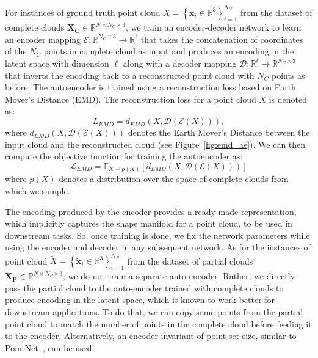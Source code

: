         For instances of ground truth point cloud $X=\left\{\mathbf{x}_{i} \in \mathbb{R}^{3}\right\}_{i=1}^{N_C}$ from the dataset of complete clouds $\mathbf{X_C} \in \mathbb{R}^{N \times N_C \times 3}$, we train an encoder-decoder network to learn an encoder mapping $\mathcal{E}: \mathbb{R}^{N_C \times 3} \rightarrow \mathbb{R}^{\ell}$ that takes the concatenation of coordinates of the $N_C$ points in complete cloud as input and produces an encoding in the latent space with dimension $\ell$ along with a decoder mapping $\mathcal{D}: \mathbb{R}^{\ell} \rightarrow \mathbb{R}^{N_C \times 3}$ that inverts the encoding back to a reconstructed point cloud with $N_C$ points as before. The autoencoder is trained using a reconstruction loss based on Earth Mover's Distance (EMD). The reconstruction loss for a point cloud $X$ is denoted as:
        \begin{equation}\label{emd_loss}
            L_{EMD} = d_{EMD}\left(X, \mathcal{D}(\mathcal{E}(X))\right),
        \end{equation}
        where $d_{EMD}\left(X, \mathcal{D}(\mathcal{E}(X))\right)$ denotes the Earth Mover's Distance between the input cloud and the reconstructed cloud (see Figure~\ref{fig:emd_ae}). We can then compute the objective function for training the autoencoder as:
        \begin{equation}\label{emd_obj}
            \mathcal{L}_{EMD} = \mathbb{E}_{X \sim p(X)} \left[d_{EMD}\left(X, \mathcal{D}(\mathcal{E}(X))\right)\right]
        \end{equation}
        where $p(X)$ denotes a distribution over the space of complete clouds from which we sample.
        \newline
        
        The encoding produced by the encoder provides a ready-made representation, which implicitly captures the shape manifold for a point cloud, to be used in downstream tasks. So, once training is done, we fix the network parameters while using the encoder and decoder in any subsequent network. As for the instances of point cloud $\tilde{X}=\left\{\mathbf{\tilde{x}}_{i} \in \mathbb{R}^{3}\right\}_{i=1}^{N_P}$ from the dataset of partial clouds $\mathbf{X_P} \in \mathbb{R}^{N \times N_P \times 3}$, we do not train a separate auto-encoder. Rather, we directly pass the partial cloud to the auto-encoder trained with complete clouds to produce encoding in the latent space, which is known to work better for downstream applications. To do that, we can copy some points from the partial point cloud to match the number of points in the complete cloud before feeding it to the encoder. Alternatively, an encoder invariant of point set size, similar to PointNet~\cite{PointNet}, can be used.


